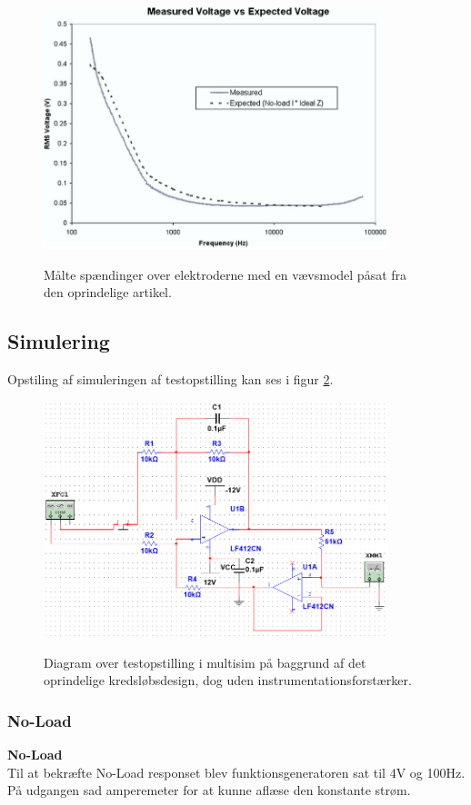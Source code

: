 \begin{figure}[H]
\centering
{\includegraphics[width=10cm]
{Figure/oprindeligerms}}
\caption{Målte spændinger over elektroderne med en vævsmodel påsat  fra den oprindelige artikel\citep{Aroom2009}.}
\label{fig:oprindeligerms}
\end{figure}

\subsection{Simulering}

Opstiling af simuleringen af testopstilling kan ses i figur \ref{fig:testopstilling1multisim}. 

\begin{figure}[H]
\centering
{\includegraphics[width=10cm]
{Figure/testopstilling1multisim}}
\caption{Diagram over testopstilling i multisim på baggrund af det oprindelige kredsløbsdesign, dog uden instrumentationsforstærker.}
\label{fig:testopstilling1multisim}
\end{figure}

\subsubsection{No-Load}
\textbf{No-Load}\\
Til at bekræfte No-Load responset blev funktionsgeneratoren sat til 4V og 100Hz. På udgangen sad amperemeter for at kunne aflæse den konstante strøm.

